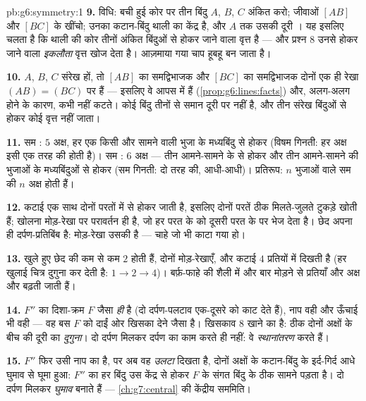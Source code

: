 \begin{solution}{pb:g6:symmetry:1}
\textbf{9.} विधि: बची हुई कोर पर तीन बिंदु $A$, $B$, $C$ अंकित
करो; जीवाओं $[AB]$ और $[BC]$ के  खींचो; उनका
कटान-बिंदु थाली का केंद्र है, और $A$ तक उसकी दूरी ।
यह इसलिए चलता है कि थाली की कोर तीनों अंकित बिंदुओं से होकर
जाने वाला वृत्त है --- और प्रश्न 8 उनसे होकर जाने वाला
\emph{इकलौता} वृत्त खोज देता है। आज़माया गया चाप हूबहू बन जाता है।

\textbf{10.} $A$, $B$, $C$ संरेख हों, तो $[AB]$ का समद्विभाजक
और $[BC]$ का समद्विभाजक दोनों एक ही रेखा $(AB) = (BC)$ पर 
हैं --- इसलिए वे आपस में  हैं
(\cref{prop:g6:lines:facts}) और, अलग-अलग होने के कारण, कभी
नहीं कटते। कोई बिंदु तीनों से समान दूरी पर नहीं है, और तीन संरेख
बिंदुओं से होकर कोई वृत्त नहीं जाता।

\textbf{11.} सम : $5$ अक्ष, हर एक किसी  और सामने वाली
भुजा के मध्यबिंदु से होकर (विषम गिनती: हर अक्ष इसी एक तरह की
होती है)। सम : $6$ अक्ष --- तीन आमने-सामने के  से
होकर और तीन आमने-सामने की भुजाओं के मध्यबिंदुओं से होकर
(सम गिनती: दो तरह की, आधी-आधी)। प्रतिरूप: $n$ भुजाओं वाले सम
 की $n$ अक्ष होती हैं।

\textbf{12.} कटाई एक साथ दोनों परतों में से होकर जाती है, इसलिए
दोनों परतें ठीक मिलते-जुलते टुकड़े खोती हैं; खोलना मोड़-रेखा पर
परावर्तन ही है, जो हर परत के  को दूसरी परत के  पर
भेज देता है। छेद अपना ही दर्पण-प्रतिबिंब है: मोड़-रेखा उसकी
 है --- चाहे जो भी काटा गया हो।

\textbf{13.} खुले हुए छेद की कम से कम $2$  होती हैं,
दोनों मोड़-रेखाएँ, और कटाई $4$ प्रतियों में दिखती है (हर खुलाई
चित्र दुगुना कर देती है: $1 \to 2 \to 4$)। बर्फ़-फाहे की शैली
में और बार मोड़ने से प्रतियाँ और अक्ष और बढ़ती जाती हैं।

\textbf{14.} $F''$ का दिशा-क्रम $F$ जैसा \emph{ही} है (दो
दर्पण-पलटाव एक-दूसरे को काट देते हैं), नाप वही और ऊँचाई भी
वही --- वह बस $F$ को दाईं ओर खिसका देने जैसा है। खिसकाव
$8$ खाने का है: ठीक दोनों अक्षों के बीच की दूरी का \emph{दुगुना}।
दो  दर्पण मिलकर दर्पण का काम करते ही नहीं: वे
\emph{स्थानांतरण} करते हैं।

\textbf{15.} $F''$ फिर उसी नाप का है, पर अब वह \emph{उलटा} दिखता
है, दोनों अक्षों के कटान-बिंदु के इर्द-गिर्द आधे घुमाव से घूमा
हुआ: $F''$ का हर बिंदु उस केंद्र से होकर $F$ के संगत बिंदु के
ठीक सामने पड़ता है। दो  दर्पण मिलकर \emph{ घुमाव} बनाते
हैं --- \cref{ch:g7:central} की केंद्रीय सममिति।

\end{solution}

